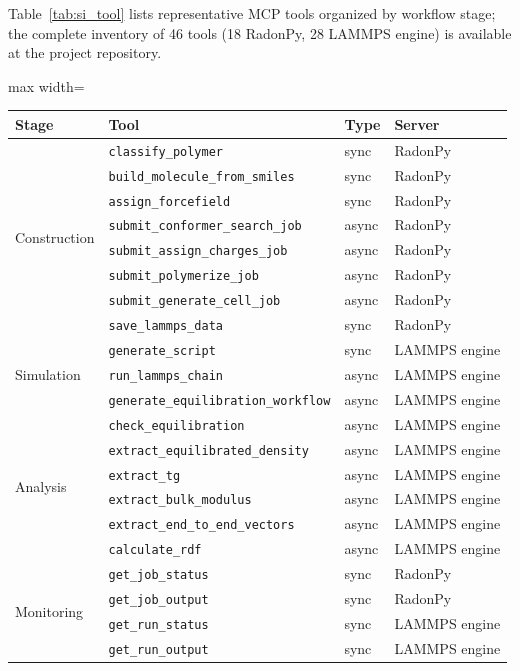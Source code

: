 \documentclass[journal=acsami,manuscript=suppinfo]{achemso}
\begin{document}
Table~\ref{tab:si_tool} lists representative MCP tools organized by workflow stage; the complete inventory of 46 tools (18 RadonPy, 28 LAMMPS engine) is available at the project repository.

\begin{adjustbox}{max width=\textwidth}
\begin{tabular}{llll}
\toprule
\textbf{Stage} & \textbf{Tool} & \textbf{Type} & \textbf{Server} \\
\midrule
\multirow{8}{*}{Construction}
& \texttt{classify\_polymer} & sync & RadonPy \\
& \texttt{build\_molecule\_from\_smiles} & sync & RadonPy \\
& \texttt{assign\_forcefield} & sync & RadonPy \\
& \texttt{submit\_conformer\_search\_job} & async & RadonPy \\
& \texttt{submit\_assign\_charges\_job} & async & RadonPy \\
& \texttt{submit\_polymerize\_job} & async & RadonPy \\
& \texttt{submit\_generate\_cell\_job} & async & RadonPy \\
& \texttt{save\_lammps\_data} & sync & RadonPy \\
\midrule
\multirow{3}{*}{Simulation}
& \texttt{generate\_script} & sync & LAMMPS engine \\
& \texttt{run\_lammps\_chain} & async & LAMMPS engine \\
& \texttt{generate\_equilibration\_workflow} & async & LAMMPS engine \\
\midrule
\multirow{6}{*}{Analysis}
& \texttt{check\_equilibration} & async & LAMMPS engine \\
& \texttt{extract\_equilibrated\_density} & async & LAMMPS engine \\
& \texttt{extract\_tg} & async & LAMMPS engine \\
& \texttt{extract\_bulk\_modulus} & async & LAMMPS engine \\
& \texttt{extract\_end\_to\_end\_vectors} & async & LAMMPS engine \\
& \texttt{calculate\_rdf} & async & LAMMPS engine \\
\midrule
\multirow{4}{*}{Monitoring}
& \texttt{get\_job\_status} & sync & RadonPy \\
& \texttt{get\_job\_output} & sync & RadonPy \\
& \texttt{get\_run\_status} & sync & LAMMPS engine \\
& \texttt{get\_run\_output} & sync & LAMMPS engine \\
\bottomrule
\end{tabular}
\end{adjustbox}
\label{tab:si_tool}
\end{document}
